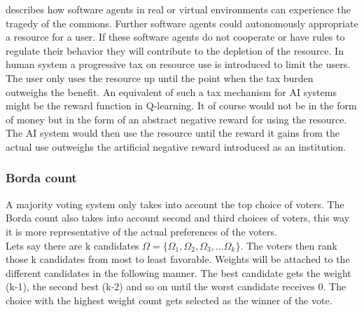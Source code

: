 \documentclass[a4paper]{article}
\begin{document}
\cite{ai_cpr} describes how software agents in real or virtual environments can experience the tragedy of the commons. Further software agents could autonomously appropriate a resource for a user. If these software agents do not cooperate or have rules to regulate their behavior they will contribute to the depletion of the resource. In human system a progressive tax on resource use is introduced to limit the users. The user only uses the resource up until the point when the tax burden outweighs the benefit\cite{ai_cpr}. An equivalent of such a tax mechanism for AI systems might be the reward function in Q-learning. It of course would not be in the form of money but in the form of an abstract negative reward for using the resource. The AI system would then use the resource until the reward it gains from the actual use outweighs the artificial negative reward introduced as an institution. 
\subsubsection{Borda count}
A majority voting system only takes into account the top choice of voters. The Borda count also takes into account second and third choices of voters, this way it is more representative of the actual preferences of the voters. \\
Lets say there are k candidates $\Omega = \{\Omega_1 , \Omega_2,\Omega_3,... \Omega_k\}$. The voters then rank those k candidates from most to least favorable. Weights will be attached to the different candidates in the following manner. The best candidate gets the weight (k-1), the second best (k-2) and so on until the worst candidate receives 0. The choice with the highest weight count gets selected as the winner of the vote.\cite{mas} \\
\end{document}
